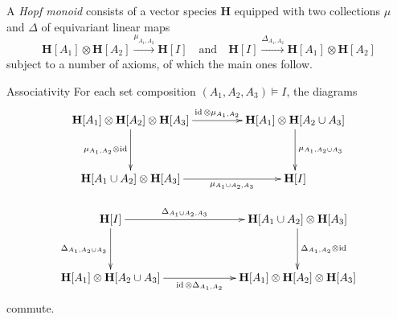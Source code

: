 \documentclass[10pt]{amsart}
\theoremstyle{definition}
\newenvironment{enonce*}[2][]{\par\smallskip\noindent\textbf{#2}.\par\nobreak}{\par\smallskip}
\newenvironment{associativity}{\begin{enonce*}[remark]{Associativity}}{\end{enonce*}}
\DeclareMathOperator{\id}{id}
\let\map=\xrightarrow
\newcommand{\bH}{\mathbf{H}}
\newcommand{\qand}{\quad\text{and}\quad}
\begin{document}
A \emph{Hopf monoid} consists of a vector species $\bH$
equipped with two collections $\mu$ and $\Delta$ of equivariant linear maps
\[
\bH[A_1]\otimes\bH[A_2] \map{\mu_{A_1,A_2}}\bH[I]
\qand
\bH[I]\map{\Delta_{A_1,A_2}} \bH[A_1]\otimes\bH[A_2]
\]
subject to a number of axioms, of which the main ones follow.

\begin{associativity}
For each set composition $(A_1, A_2, A_3)\models I$, the diagrams
\begin{equation}\label{e:assoc}
\begin{gathered}
\xymatrix@R+1pc@C+20pt{
\bH[A_1]\otimes\bH[A_2]\otimes\bH[A_3]\ar[r]^-{\id\otimes\mu_{A_1,A_2}}
\ar[d]_{\mu_{A_1,A_2}\otimes\id} & \bH[A_1]\otimes\bH[A_2\cup A_3]\ar[d]^{\mu_{A_1,A_2\cup A_3}} \\
\bH[A_1\cup A_2]\otimes \bH[A_3]\ar[r]_-{\mu_{A_1\cup A_2,A_3}} & \bH[I]
}
\end{gathered}
\end{equation}

\begin{equation}
\label{e:coassoc}
\begin{gathered}
\xymatrix@R+1pc@C+40pt{
\bH[I]\ar[r]^-{\Delta_{A_1\cup A_2,A_3}} \ar[d]_{\Delta_{A_1,A_2\cup A_3}}
& \bH[A_1\cup A_2]\otimes \bH[A_3]\ar[d]^{\Delta_{A_1,A_2}\otimes\id}
\\
\bH[A_1]\otimes\bH[A_2\cup A_3]\ar[r]_-{\id\otimes\Delta_{A_1,A_2}}
& \bH[A_1]\otimes\bH[A_2]\otimes\bH[A_3]
}
\end{gathered}
\end{equation}
commute.
\end{associativity}

\end{document}
